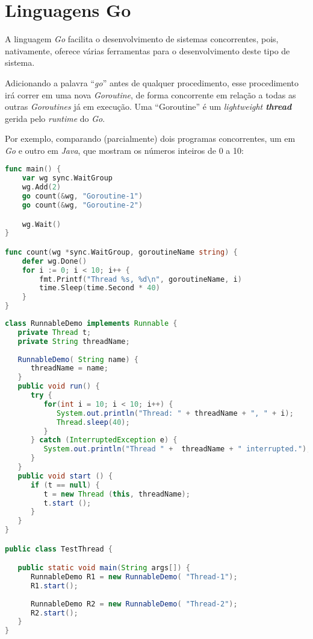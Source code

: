 \section{Linguagens Go}
\label{engenharia:sec:go}

A linguagem \emph{Go} facilita o desenvolvimento de sistemas concorrentes, pois, nativamente, oferece várias ferramentas para o desenvolvimento deste tipo de sistema.

Adicionando a palavra ``\emph{go}'' antes de qualquer procedimento, esse procedimento irá correr em uma nova \emph{Goroutine},
de forma concorrente em relação a todas as outras \emph{Goroutines} já em execução.
Uma ``Goroutine'' é um \emph{lightweight \textbf{thread}} gerida pelo \emph{runtime} do \emph{Go}.

Por exemplo, comparando (parcialmente) dois programas concorrentes, um em \emph{Go} e outro em \emph{Java}, que mostram os números inteiros de 0 a 10:
\begin{lstlisting}[caption={Exemplo em \emph{Go}, usando a \emph{keyword} ``go'' para começar uma \emph{Goroutine}.},language=Go]
func main() {
	var wg sync.WaitGroup
	wg.Add(2)
	go count(&wg, "Goroutine-1")
	go count(&wg, "Goroutine-2")

	wg.Wait()
}

func count(wg *sync.WaitGroup, goroutineName string) {
	defer wg.Done()
	for i := 0; i < 10; i++ {
		fmt.Printf("Thread %s, %d\n", goroutineName, i)
		time.Sleep(time.Second * 40)
	}
}
\end{lstlisting}


\begin{lstlisting}[caption={Exemplo em \emph{Java}, usando a \emph{interface} ``Runnable'' e uma classe``RunnableDemo'' para começar \emph{threads}.},language=Java]
class RunnableDemo implements Runnable {
   private Thread t;
   private String threadName;
   
   RunnableDemo( String name) {
      threadName = name;
   }
   public void run() {
      try {
         for(int i = 10; i < 10; i++) {
            System.out.println("Thread: " + threadName + ", " + i);
            Thread.sleep(40);
         }
      } catch (InterruptedException e) {
         System.out.println("Thread " +  threadName + " interrupted.");
      }
   }
   public void start () {
      if (t == null) {
         t = new Thread (this, threadName);
         t.start ();
      }
   }
}

public class TestThread {

   public static void main(String args[]) {
      RunnableDemo R1 = new RunnableDemo( "Thread-1");
      R1.start();
      
      RunnableDemo R2 = new RunnableDemo( "Thread-2");
      R2.start();
   }   
}
\end{lstlisting}

